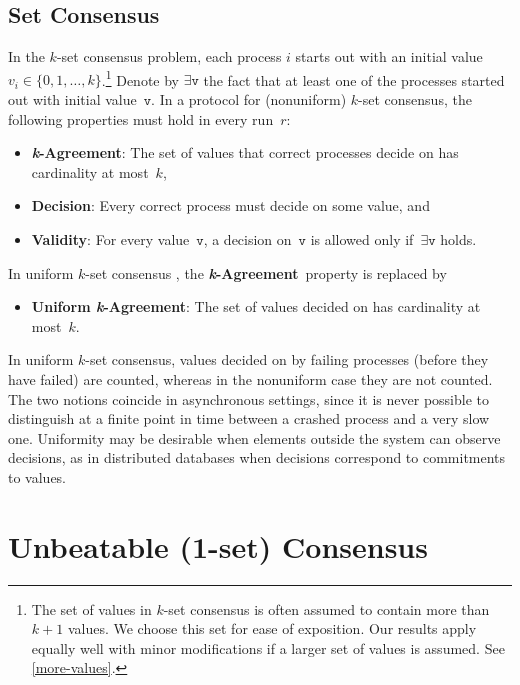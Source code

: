 \documentclass[11pt]{article}
\theoremstyle{definition}
\newcommand{\mv}{\mathtt{v}}
\newcommand{\existsv}{\exists{\mv}}
\newcommand{\defemph}[1]{\textbf{\textit{#1}}}
\newcommand{\kAgreement}{{\bf \defemph{k}-Agreement}}
\newcommand{\UnikAg}{{\bf Uniform \defemph{k}-Agreement}}
\newcommand{\Decision}{{\bf Decision}}
\newcommand{\Validity}{{\bf Validity}}
\begin{document}
\subsection{Set Consensus}

In the $k$-set consensus problem, each process $i$ starts out with an initial value $v_i\in\{0,1,\ldots,k\}$.\footnote{The set of values in $k$-set consensus is  often assumed to contain more than $k+1$ values. We choose this set for ease of exposition. Our results apply equally well with minor modifications if a larger set of values is assumed. See \cref{more-values}.}
Denote by $\existsv$ the fact that at least one of the processes started out with initial value~$\mathtt{v}$.
In  a protocol for (nonuniform) $k$-set consensus,
the following properties must hold in every run~$r$:

\begin{itemize}
\item[]{\kAgreement:}
The set of values that correct processes decide on has cardinality at most~$k$,
\item[]{\Decision:} Every correct process must decide on some value, and
\item[]{\Validity:} For every value~$\mathtt{v}$, a decision on~$\mathtt{v}$ is allowed only if~$\existsv$ holds.
\end{itemize}

In uniform $k$-set consensus \cite{CBS-uni,Dutta-uni,H86,KR-uni,Raynal04-uni,WTC-uni}, the \kAgreement\ property is replaced by

\begin{itemize}
\item[]{\UnikAg:}
The set of values decided on
has cardinality at most~$k$.
\end{itemize}

\noindent
In uniform $k$-set consensus,
values decided on by failing processes
(before they have failed)
are counted, whereas in the nonuniform case they are not
counted.
The two notions coincide in asynchronous settings, since it is never possible to distinguish at a finite point in time between a crashed process and a very slow one.
Uniformity may be desirable
when elements outside the system can observe decisions, as in distributed databases when decisions correspond to commitments to values.

\section{Unbeatable (1-set) Consensus}
\label{sec:unB-consensus}
\end{document}
